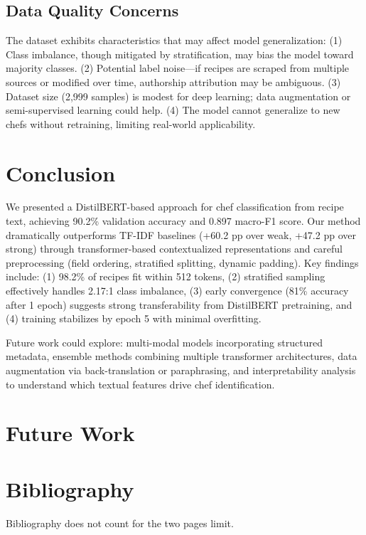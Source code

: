 \documentclass[twocolumn,10pt]{article}
\begin{document}
\subsection{Data Quality Concerns}

The dataset exhibits characteristics that may affect model generalization: (1) Class imbalance, though mitigated by stratification, may bias the model toward majority classes. (2) Potential label noise—if recipes are scraped from multiple sources or modified over time, authorship attribution may be ambiguous. (3) Dataset size (2,999 samples) is modest for deep learning; data augmentation or semi-supervised learning could help. (4) The model cannot generalize to new chefs without retraining, limiting real-world applicability. 

\section{Conclusion}

We presented a DistilBERT-based approach for chef classification from recipe text, achieving 90.2\% validation accuracy and 0.897 macro-F1 score. Our method dramatically outperforms TF-IDF baselines (+60.2 pp over weak, +47.2 pp over strong) through transformer-based contextualized representations and careful preprocessing (field ordering, stratified splitting, dynamic padding). Key findings include: (1) 98.2\% of recipes fit within 512 tokens, (2) stratified sampling effectively handles 2.17:1 class imbalance, (3) early convergence (81\% accuracy after 1 epoch) suggests strong transferability from DistilBERT pretraining, and (4) training stabilizes by epoch 5 with minimal overfitting.

Future work could explore: multi-modal models incorporating structured metadata, ensemble methods combining multiple transformer architectures, data augmentation via back-translation or paraphrasing, and interpretability analysis to understand which textual features drive chef identification.

\section{Future Work}

\section*{Bibliography}



Bibliography does not count for the two pages limit.
\end{document}
